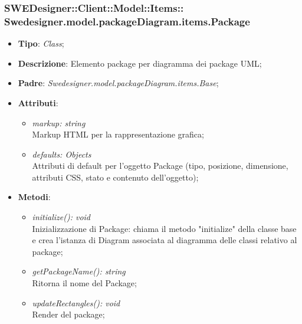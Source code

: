 \documentclass[../DefinizioneDiProdotto.tex]{subfiles}
\begin{document}
			\subsubsection[Swedesigner.model.packageDiagram.items.Package]{SWEDesigner::Client::Model::Items::\\Swedesigner.model.packageDiagram.items.Package}
			\hypertarget{SWEDesigner::Client::Model::Items::Swedesigner.model.packageDiagram.items.Package}{}
			\begin{itemize}
				\item \textbf{Tipo}: \emph{Class};
				\item \textbf{Descrizione}: Elemento package per diagramma dei package UML;
				\item \textbf{Padre}: \emph{Swedesigner.model.packageDiagram.items.Base};
				\item \textbf{Attributi}:
				\begin{itemize}
					\item \emph{markup: string}\\
					Markup HTML per la rappresentazione grafica;
					\item \emph{defaults: Objects}\\
					Attributi di default per l'oggetto Package (tipo, posizione, dimensione, attributi CSS, stato e contenuto dell'oggetto);
				\end{itemize}
				\item \textbf{Metodi}:
				\begin{itemize}
					\item \emph{initialize(): void}\\
					Inizializzazione di Package: chiama il metodo "initialize" della classe base e crea l'istanza di Diagram associata al diagramma delle classi relativo al package;
					\item \emph{getPackageName(): string}\\
					Ritorna il nome del Package;
					\item \emph{updateRectangles(): void}\\
					Render del package;
				\end{itemize}
			\end{itemize}
			
\end{document}
